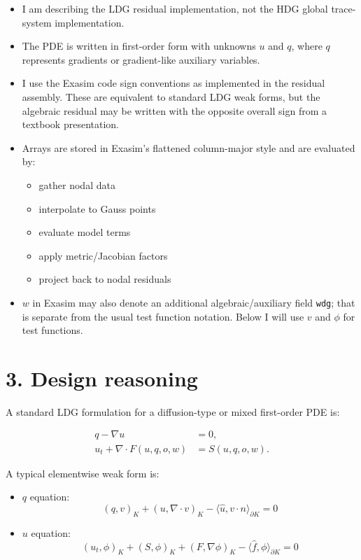 \documentclass[11pt]{article}
\begin{document}
\begin{itemize}[leftmargin=*]
\item I am describing the LDG residual implementation, not the HDG global
trace-system implementation.
\item The PDE is written in first-order form with unknowns $u$ and $q$, where
$q$ represents gradients or gradient-like auxiliary variables.
\item I use the Exasim code sign conventions as implemented in the residual
assembly. These are equivalent to standard LDG weak forms, but the algebraic
residual may be written with the opposite overall sign from a textbook
presentation.
\item Arrays are stored in Exasim's flattened column-major style and are
evaluated by:
\begin{itemize}[leftmargin=*]
\item gather nodal data
\item interpolate to Gauss points
\item evaluate model terms
\item apply metric/Jacobian factors
\item project back to nodal residuals
\end{itemize}
\item $w$ in Exasim may also denote an additional algebraic/auxiliary field
\texttt{wdg}; that is separate from the usual test function notation. Below I
will use $v$ and $\phi$ for test functions.
\end{itemize}

\section*{3. Design reasoning}

A standard LDG formulation for a diffusion-type or mixed first-order PDE is:

\begin{align*}
q - \nabla u &= 0, \\
u_t + \nabla \cdot F(u,q,o,w) &= S(u,q,o,w).
\end{align*}

A typical elementwise weak form is:

\begin{itemize}[leftmargin=*]
\item $q$ equation:
\[
(q, v)_K + (u, \nabla \cdot v)_K - \langle \hat{u}, v \cdot n \rangle_{\partial K} = 0
\]
\item $u$ equation:
\[
(u_t, \phi)_K + (S, \phi)_K + (F, \nabla \phi)_K - \langle \hat{f}, \phi \rangle_{\partial K} = 0
\]
\end{itemize}
\end{document}
